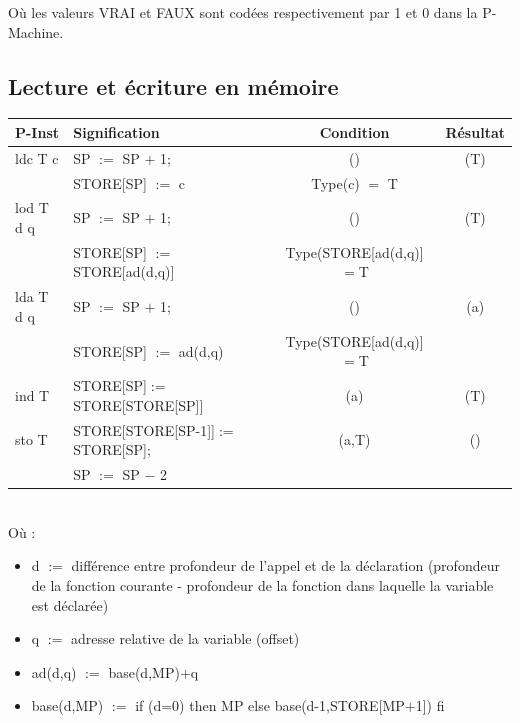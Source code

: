 \documentclass[french,11pt,twoside]{article}
\begin{document}
O\`{u}  les valeurs VRAI et FAUX sont codées respectivement par 1 et 0 dans la P-Machine.


\subsection{Lecture et écriture en mémoire}

\begin{tabular}{|l|l|c|c|}
\hline
P-Inst        & Signification                                                       & Condition                             & Résultat \\
\hline
ldc T c       & SP $:=$ SP $+$ 1;                                              & ()                                          & (T)\\
                 & STORE[SP] $:=$ c                                                & Type(c) $=$ T                      & \\
\hline
lod T d q   & SP $:=$ SP $+$ 1;                                               & ()                                           & (T)\\
                 & STORE[SP] $:=$ STORE[ad(d,q)]                           & Type(STORE[ad(d,q)]$=$T     & \\
lda T d q   & SP $:=$ SP $+$ 1;                                               & ()                                           & (a)\\
                 & STORE[SP] $:=$ ad(d,q)                                       & Type(STORE[ad(d,q)]$=$T     & \\
ind T         & STORE[SP]$:=$STORE[STORE[SP]]                         & (a)                                         & (T)\\
\hline
sto T        & STORE[STORE[SP-1]]$:=$STORE[SP];                     & (a,T)                                      & ()\\
                & SP $:=$ SP $-$ 2                                                 &                                              & \\
\hline
\end{tabular}
\\

O\`{u}  :
\begin{itemize}
\item d $:=$ différence entre profondeur de l'appel et de la déclaration (profondeur de la fonction courante - profondeur de la fonction dans laquelle la variable est déclarée)
\item q $:=$ adresse relative de la variable (offset)
\item ad(d,q) $:=$ base(d,MP)$+$q 
\item base(d,MP) $:=$ if (d=0) then MP else base(d-1,STORE[MP$+$1]) fi
\end{itemize}
\end{document}
